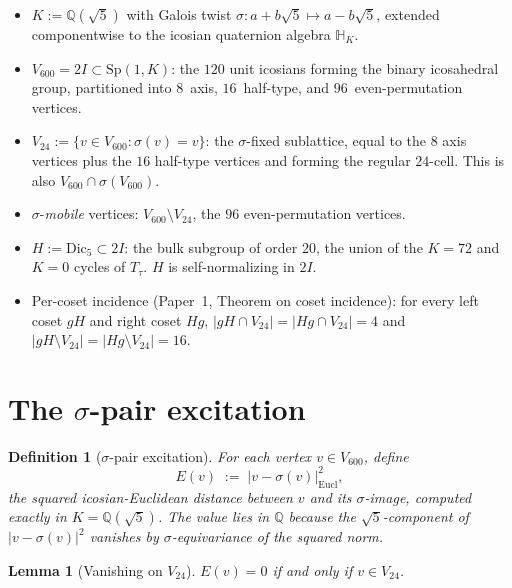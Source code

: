 \documentclass[11pt]{article}
\newtheorem{lemma}{Lemma}[section]
\newtheorem{definition}{Definition}[section]
\newcommand{\twoI}{2I}
\newcommand{\Vsixhundred}{V_{600}}
\newcommand{\Dicfive}{\mathrm{Dic}_5}
\newcommand{\Vtwentyfour}{V_{24}}
\newcommand{\sigmaG}{\sigma}
\begin{document}
\begin{itemize}[leftmargin=2em]
\item $K := \mathbb{Q}(\sqrt{5})$ with Galois twist
$\sigmaG : a + b\sqrt{5} \mapsto a - b\sqrt{5}$, extended componentwise
to the icosian quaternion algebra $\mathbb{H}_K$.
\item $\Vsixhundred = \twoI \subset \mathrm{Sp}(1, K)$: the $120$ unit
icosians forming the binary icosahedral group, partitioned into
$8$~axis, $16$~half-type, and $96$~even-permutation vertices.
\item $\Vtwentyfour := \{ v \in \Vsixhundred : \sigmaG(v) = v \}$: the
$\sigmaG$-fixed sublattice, equal to the $8$ axis vertices plus the $16$
half-type vertices and forming the regular $24$-cell. This is also
$\Vsixhundred \cap \sigmaG(\Vsixhundred)$.
\item $\sigmaG$-\emph{mobile} vertices: $\Vsixhundred \setminus \Vtwentyfour$,
the $96$ even-permutation vertices.
\item $H := \Dicfive \subset \twoI$: the bulk subgroup of order $20$,
the union of the $K=72$ and $K=0$ cycles of $T_\tau$. $H$ is
self-normalizing in $\twoI$.
\item Per-coset incidence (Paper~1, Theorem on coset incidence):
for every left coset $gH$ and right coset $Hg$,
$|gH \cap \Vtwentyfour| = |Hg \cap \Vtwentyfour| = 4$ and
$|gH \setminus \Vtwentyfour| = |Hg \setminus \Vtwentyfour| = 16$.
\end{itemize}

\section{The $\sigmaG$-pair excitation}\label{sec:obs}

\begin{definition}[$\sigmaG$-pair excitation]\label{def:Eobs}
For each vertex $v \in \Vsixhundred$, define
\[
  E(v) \;:=\; |v - \sigmaG(v)|^2_{\mathrm{Eucl}},
\]
the squared icosian-Euclidean distance between $v$ and its $\sigmaG$-image,
computed exactly in $K = \mathbb{Q}(\sqrt{5})$. The value lies in
$\mathbb{Q}$ because the $\sqrt{5}$-component of $|v - \sigmaG(v)|^2$
vanishes by $\sigmaG$-equivariance of the squared norm.
\end{definition}

\begin{lemma}[Vanishing on $\Vtwentyfour$]\label{lem:vanish}
$E(v) = 0$ if and only if $v \in \Vtwentyfour$.
\end{lemma}
\end{document}
